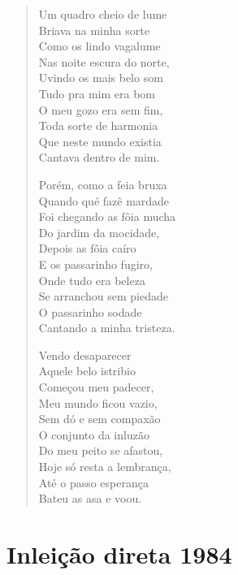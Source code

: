 \begin{verse}
Um quadro cheio de lume\\
Briava na minha sorte\\
Como os lindo vagalume\\
Nas noite escura do norte,\\
Uvindo os mais belo som\\
Tudo pra mim era bom\\
O meu gozo era sem fim,\\
Toda sorte de harmonia\\
Que neste mundo existia\\
Cantava dentro de mim.

Porém, como a feia bruxa\\
Quando qué fazê mardade\\
Foi chegando as fôia mucha\\
Do jardim da mocidade,\\
Depois as fôia caíro\\
E os passarinho fugiro,\\
Onde tudo era beleza\\
Se arranchou sem piedade\\
O passarinho sodade\\
Cantando a minha tristeza.

Vendo desaparecer\\
Aquele belo istribio\\
Começou meu padecer,\\
Meu mundo ficou vazio,\\
Sem dó e sem compaxão\\
O conjunto da inluzão\\
Do meu peito se afastou,\\
Hoje só resta a lembrança,\\
Até o passo esperança\\
Bateu as asa e voou.
\end{verse}

\chapter{Inleição direta 1984}


